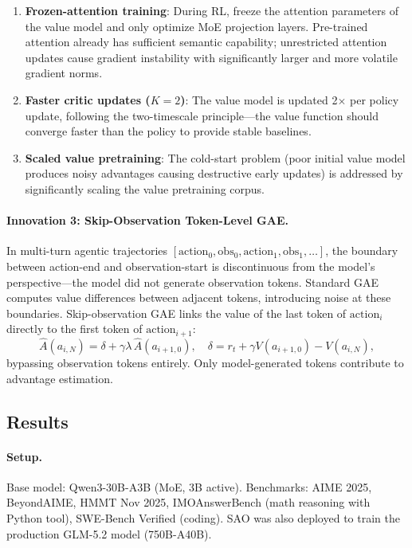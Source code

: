 \documentclass[11pt,a4paper]{article}
\begin{document}
\begin{enumerate}
\item \textbf{Frozen-attention training}: During RL, freeze the attention parameters of the value model and only optimize MoE projection layers. Pre-trained attention already has sufficient semantic capability; unrestricted attention updates cause gradient instability with significantly larger and more volatile gradient norms.
\item \textbf{Faster critic updates ($K = 2$)}: The value model is updated 2$\times$ per policy update, following the two-timescale principle---the value function should converge faster than the policy to provide stable baselines.
\item \textbf{Scaled value pretraining}: The cold-start problem (poor initial value model produces noisy advantages causing destructive early updates) is addressed by significantly scaling the value pretraining corpus.
\end{enumerate}

\paragraph{Innovation 3: Skip-Observation Token-Level GAE.} In multi-turn agentic trajectories $[\mathrm{action}_0, \mathrm{obs}_0, \mathrm{action}_1, \mathrm{obs}_1, \ldots]$, the boundary between action-end and observation-start is discontinuous from the model's perspective---the model did not generate observation tokens. Standard GAE computes value differences between adjacent tokens, introducing noise at these boundaries. Skip-observation GAE links the value of the last token of $\mathrm{action}_i$ directly to the first token of $\mathrm{action}_{i+1}$:
\[
\hat{A}(a_{i,N}) = \delta + \gamma \lambda \, \hat{A}(a_{i+1,0}), \quad \delta = r_t + \gamma V(a_{i+1,0}) - V(a_{i,N}),
\]
bypassing observation tokens entirely. Only model-generated tokens contribute to advantage estimation.

\subsection{Results}

\paragraph{Setup.} Base model: Qwen3-30B-A3B (MoE, 3B active). Benchmarks: AIME 2025, BeyondAIME, HMMT Nov 2025, IMOAnswerBench (math reasoning with Python tool), SWE-Bench Verified (coding). SAO was also deployed to train the production GLM-5.2 model (750B-A40B).
\end{document}
